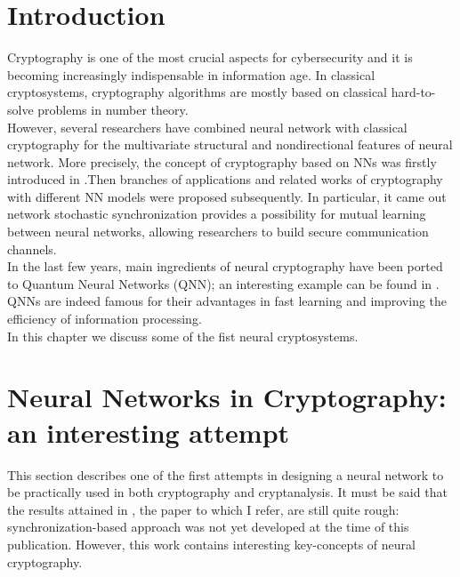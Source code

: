\documentclass[%
    corpo=11pt,
    twoside,
    stile=classica,
    oldstyle,
    autoretitolo,
    tipotesi=magistrale,
    greek,
    evenboxes,
    english
]{toptesi}
\begin{document}
\section{Introduction}
Cryptography is one of the most crucial aspects for cybersecurity and it is becoming increasingly indispensable in information age. In classical cryptosystems, cryptography algorithms are mostly based on classical hard-to-solve problems in number theory. \\
However, several researchers have combined neural network with classical cryptography for the multivariate structural and nondirectional features of neural network. More precisely, the concept of cryptography based on NNs was firstly introduced in \cite{lauria}.Then branches of applications and related works of cryptography with different NN models were proposed subsequently. In particular, it came out network stochastic synchronization provides a possibility for mutual learning between neural networks, allowing researchers to build secure communication channels. \\
In the last few years, main ingredients of neural cryptography have been ported to Quantum Neural Networks (QNN); an interesting example can be found in \cite{china}. QNNs are indeed famous for their advantages in fast learning and improving the efficiency of information processing. \\
In this chapter we discuss some of the fist neural cryptosystems.
\newpage

\section{Neural Networks in Cryptography: an interesting attempt}
This section describes one of the first attempts in designing a neural network to be practically used in both cryptography and cryptanalysis. It must be said that the results attained in \cite{volna}, the paper to which I refer, are still quite rough: synchronization-based approach was not yet developed at the time of this publication. However, this work contains interesting key-concepts of neural cryptography. 
\end{document}
